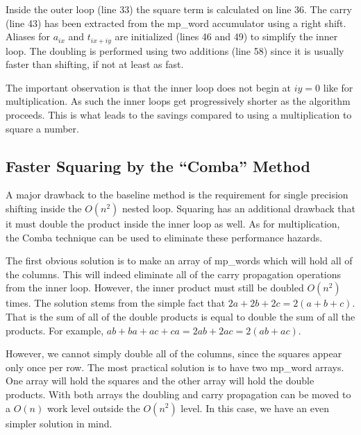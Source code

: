 \documentclass[b5paper]{book}
\begin{document}
Inside the outer loop (line 33) the square term is calculated on line 36.  The carry (line 43) has been
extracted from the mp\_word accumulator using a right shift.  Aliases for $a_{ix}$ and $t_{ix+iy}$ are initialized 
(lines 46 and 49) to simplify the inner loop.  The doubling is performed using two
additions (line 58) since it is usually faster than shifting, if not at least as fast.  

The important observation is that the inner loop does not begin at $iy = 0$ like for multiplication.  As such the inner loops
get progressively shorter as the algorithm proceeds.  This is what leads to the savings compared to using a multiplication to
square a number. 

\subsection{Faster Squaring by the ``Comba'' Method}
A major drawback to the baseline method is the requirement for single precision shifting inside the $O(n^2)$ nested loop.  Squaring has an additional
drawback that it must double the product inside the inner loop as well.  As for multiplication, the Comba technique can be used to eliminate these
performance hazards.

The first obvious solution is to make an array of mp\_words which will hold all of the columns.  This will indeed eliminate all of the carry
propagation operations from the inner loop.  However, the inner product must still be doubled $O(n^2)$ times.  The solution stems from the simple fact
that $2a + 2b + 2c = 2(a + b + c)$.  That is the sum of all of the double products is equal to double the sum of all the products.  For example,
$ab + ba + ac + ca = 2ab + 2ac = 2(ab + ac)$.  

However, we cannot simply double all of the columns, since the squares appear only once per row.  The most practical solution is to have two 
mp\_word arrays.  One array will hold the squares and the other array will hold the double products.  With both arrays the doubling and 
carry propagation can be moved to a $O(n)$ work level outside the $O(n^2)$ level.  In this case, we have an even simpler solution in mind.
\end{document}
